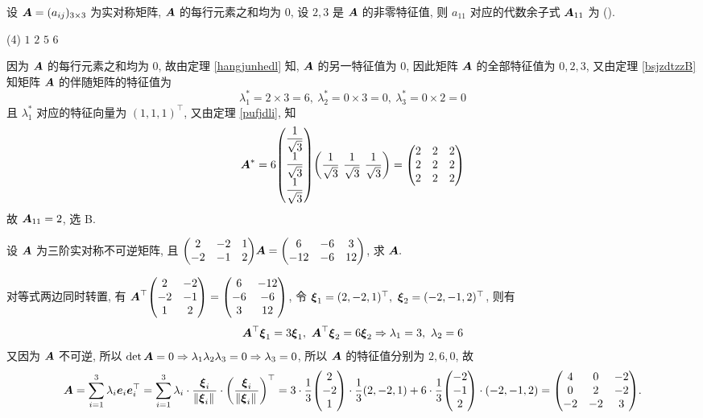 \begin{example}
    设 $\vb*{A}=(a_{ij})_{3\times3}$ 为实对称矩阵, $\vb*{A}$ 的每行元素之和均为 $0$, 设 $2,3$ 是 $\vb*{A}$ 的非零特征值, 则 $a_{11}$ 对应的代数余子式 $\vb*{A}_{11}$ 为 (\quad).
    \begin{tasks}(4)
        \task $1$
        \task $2$
        \task $5$
        \task $6$
    \end{tasks}
\end{example}
\begin{solution}
    因为 $\vb*{A}$ 的每行元素之和均为 $0$, 故由定理 \ref{hangjunhedl} 知, $\vb*{A}$ 的另一特征值为 $0$, 因此矩阵 $\vb*{A}$ 的全部特征值为 $0,2,3$, 又由定理 \ref{bsjzdtzzB} 知矩阵 $\vb*{A}$ 的伴随矩阵的特征值为
    $$\lambda_1^*=2\times3=6,~\lambda_2^*=0\times 3=0,~\lambda_3^*=0\times 2=0$$
    且 $\lambda_1^*$ 对应的特征向量为 $(1,1,1)^\top$, 又由定理 \ref{pufjdli}, 知 $$\vb*{A}^*=6\mqty(\dfrac{1}{\sqrt{3}}\\[6pt]\dfrac{1}{\sqrt{3}}\\[6pt]\dfrac{1}{\sqrt{3}})\qty(\dfrac{1}{\sqrt{3}}~\dfrac{1}{\sqrt{3}}~\dfrac{1}{\sqrt{3}})=\mqty(2&2&2\\2&2&2\\2&2&2)$$
    故 $\vb*{A}_{11}=2$, 选 B.
\end{solution}

\begin{example}
    设 $\vb*{A}$ 为三阶实对称不可逆矩阵, 且 $\mqty(2&-2&1\\-2&-1&2)\vb*{A}=\mqty(6&-6&3\\-12&-6&12)$, 求 $\vb*{A}.$
\end{example}
\begin{solution}
    对等式两边同时转置, 有 $\vb*{A}^\top\mqty(2&-2\\-2&-1\\1&2)=\mqty(6&-12\\-6&-6\\3&12)$, 令 $\vb*{\xi}_1=(2,-2,1)^\top,~\vb*{\xi}_2=(-2,-1,2)^\top$, 则有 $$\vb*{A}^\top\vb*{\xi}_1=3\vb*{\xi}_1,~\vb*{A}^\top\vb*{\xi}_2=6\vb*{\xi}_2\Rightarrow \lambda_1=3,~\lambda_2=6$$
    又因为 $\vb*{A}$ 不可逆, 所以 $\det\vb*{A}=0\Rightarrow \lambda_1\lambda_2\lambda_3=0\Rightarrow \lambda_3=0$, 所以 $\vb*{A}$ 的特征值分别为 $2,6,0$, 故
    $$\vb*{A}=\sum_{i=1}^{3}\lambda_i\vb*{e}_i\vb*{e}_i^\top=\sum_{i=1}^{3}\lambda_i\cdot\dfrac{\vb*{\xi}_i}{\norm*{\vb*{\xi}_i}}\cdot\qty(\dfrac{\vb*{\xi}_i}{\norm*{\vb*{\xi}_i}})^\top=3\cdot\dfrac{1}{3}\mqty(2\\-2\\1)\cdot\dfrac{1}{3}(2,-2,1)+6\cdot\dfrac{1}{3}\mqty(-2\\-1\\2)\cdot(-2,-1,2)=\mqty(4&0&-2\\0&2&-2\\-2&-2&3).$$
\end{solution}

